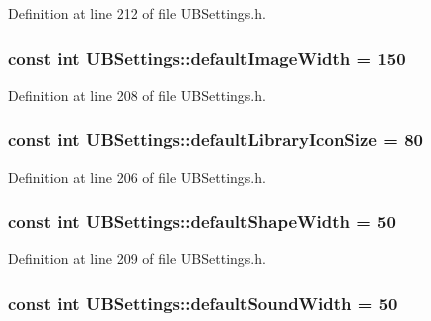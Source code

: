 Definition at line 212 of file U\-B\-Settings.\-h.

\hypertarget{class_u_b_settings_a2544c7a176904cf329a239a6352c77ed}{
\subsubsection[{default\-Image\-Width}]{\setlength{\rightskip}{0pt plus 5cm}const int U\-B\-Settings\-::default\-Image\-Width = 150\hspace{0.3cm}{\ttfamily [static]}}}\label{db/d66/class_u_b_settings_a2544c7a176904cf329a239a6352c77ed}


Definition at line 208 of file U\-B\-Settings.\-h.

\hypertarget{class_u_b_settings_ab45c93d398ec2d37a65a8e463a7734d1}{
\subsubsection[{default\-Library\-Icon\-Size}]{\setlength{\rightskip}{0pt plus 5cm}const int U\-B\-Settings\-::default\-Library\-Icon\-Size = 80\hspace{0.3cm}{\ttfamily [static]}}}\label{db/d66/class_u_b_settings_ab45c93d398ec2d37a65a8e463a7734d1}


Definition at line 206 of file U\-B\-Settings.\-h.

\hypertarget{class_u_b_settings_a717ca3e6f874a3b6a2e674016a74862d}{
\subsubsection[{default\-Shape\-Width}]{\setlength{\rightskip}{0pt plus 5cm}const int U\-B\-Settings\-::default\-Shape\-Width = 50\hspace{0.3cm}{\ttfamily [static]}}}\label{db/d66/class_u_b_settings_a717ca3e6f874a3b6a2e674016a74862d}


Definition at line 209 of file U\-B\-Settings.\-h.

\hypertarget{class_u_b_settings_a830e97d1582930a84bf96845f6b7a141}{
\subsubsection[{default\-Sound\-Width}]{\setlength{\rightskip}{0pt plus 5cm}const int U\-B\-Settings\-::default\-Sound\-Width = 50\hspace{0.3cm}{\ttfamily [static]}}}\label{db/d66/class_u_b_settings_a830e97d1582930a84bf96845f6b7a141}


